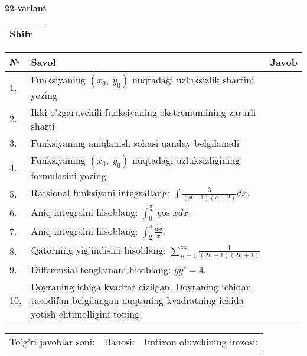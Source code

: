 \documentclass{article}
\begin{document}
  \egroup
  
  \newpage
  
  
  \textbf{22-variant}\\
  
  \bgroup
  \def\arraystretch{1.6} %
  
  \begin{tabular}{|m{5.7cm}|m{9.5cm}|}
  \hline
  Shifr & \\
  \hline
  \end{tabular}
  
  \vspace{1cm}
  
  \begin{tabular}{|m{0.7cm}|m{10cm}|m{4cm}|}
  \hline
  № & Savol & Javob \\
  \hline
  1. & Funksiyaning \((x_{0},\ y_{0})\) nuqtadagi uzluksizlik shartini yozing &  \\
  \hline
  2. & Ikki o'zgaruvchili funksiyaning ekstremumining zarurli sharti &  \\
  \hline
  3. & Funksiyaning aniqlanish sohasi qanday belgilanadi &  \\
  \hline
  4. & Funksiyaning \((x_{0},\ y_{0})\) nuqtadagi uzluksizligining formulasini yozing &  \\
  \hline
  5. & Ratsional funksiyani integrallang: \(\int {\frac{3}{(x - 1)(x + 2)}dx}\). &  \\
  \hline
  6. & Aniq integralni hisoblang: \(\int_{0}^{\frac{\pi}{2}}{\cos xdx}\). &  \\
  \hline
  7. & Aniq integralni hisoblang: \(\int_{2}^{4}\frac{dx}{x}\). &  \\
  \hline
  8. & Qatorning yig'indisini hisoblang: \(\sum_{n = 1}^{\infty}\frac{1}{(2n - 1)(2n + 1)}\) &  \\
  \hline
  9. & Differensial tenglamani hisoblang: \(yy' = 4\). &  \\
  \hline
  10. & Doyraning ichiga kvadrat cizilgan. Doyraning ichidan tasodifan belgilangan nuqtaning kvadratning ichida yotish ehtimolligini toping. &  \\
  \hline
  \end{tabular}
  
  \vspace{1cm}
  
  \begin{tabular}{lll}
  To'g'ri javoblar soni: \underline{\hspace{1.5cm}} & 
  Bahosi: \underline{\hspace{1.5cm}} & 
  Imtixon oluvchining imzosi: \underline{\hspace{2cm}} \\
  \end{tabular}
  
\end{document}
